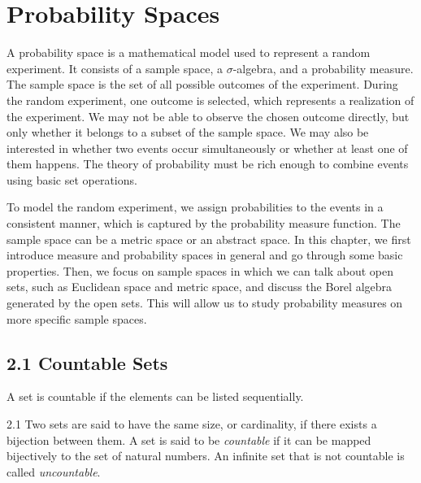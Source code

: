 \section*{Probability Spaces}

A probability space is a mathematical model used to represent a random experiment. It consists of a sample space, a $\sigma$-algebra, and a probability measure. The sample space is the set of all possible outcomes of the experiment. During the random experiment, one outcome is selected, which represents a realization of the experiment. We may not be able to observe the chosen outcome directly, but only whether it belongs to a subset of the sample space. We may also be interested in whether two events occur simultaneously or whether at least one of them happens. The theory of probability must be rich enough to combine events using basic set operations.

To model the random experiment, we assign probabilities to the events in a consistent manner, which is captured by the probability measure function. The sample space can be a metric space or an abstract space. In this chapter, we first introduce measure and probability spaces in general and go through some basic properties. Then, we focus on sample spaces in which we can talk about open sets, such as Euclidean space and metric space, and discuss the Borel algebra generated by the open sets. This will allow us to study probability measures on more specific sample spaces.

\subsection*{2.1 Countable Sets}

A set is countable if the elements can be listed sequentially.

\begin{defbox}{2.1}
Two sets are said to have the same size, or cardinality, if there exists a bijection between them. A set is said to be \textit{countable} if it can be mapped bijectively to the set of natural numbers. An infinite set that is not countable is called \textit{uncountable}.
\end{defbox}

